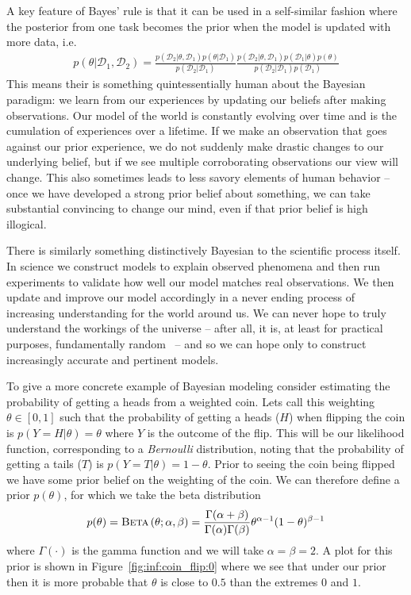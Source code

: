 A key feature of Bayes' rule is that it can be used in a self-similar fashion where the posterior from
one task becomes the prior when the model is updated with more data, i.e.
\begin{align}
	\label{eq:bayes:repeat-bayes}
p(\theta | \mathcal{D}_1, \mathcal{D}_2) = 
\frac{p(\mathcal{D}_2 | \theta, \mathcal{D}_1)p(\theta | \mathcal{D}_1)}{p(\mathcal{D}_2 | \mathcal{D}_1)}
\frac{p(\mathcal{D}_2 | \theta, \mathcal{D}_1)p(\mathcal{D}_1 | \theta) p(\theta)}
{p(\mathcal{D}_2 | \mathcal{D}_1) p(\mathcal{D}_1)} 
\end{align}
This means their is something quintessentially human about the Bayesian paradigm: we learn
from our experiences by updating our beliefs after making observations.  Our model of the world
is constantly evolving over time and is the cumulation of experiences over a lifetime.  
If we make an observation that goes against our prior experience, we do not suddenly make
drastic changes to our underlying belief, but if we see multiple corroborating observations our
view will change.
This also sometimes leads to less savory elements of human behavior -- once we have developed
a strong prior belief about something, we can take substantial convincing to change our mind, even
if that prior belief is high illogical.

There is similarly something distinctively Bayesian to the scientific process itself.  In science we construct models
to explain observed phenomena and then run experiments to validate how well our model matches
real observations.  We then update and improve our model accordingly in a never ending process of
increasing understanding for the world around us.  We can never hope to truly understand the workings
of the universe  -- after all, it is, at least for practical purposes, fundamentally random~\citep{rainforth2013random} 
-- and so we can hope only to construct increasingly accurate and pertinent models.

To give a more concrete example of Bayesian modeling consider estimating
the probability of getting a heads from a weighted coin.  Lets call this weighting $\theta \in [0,1]$ such
that the probability of getting a heads  ($H$)  when flipping the coin is $p(Y=H | \theta)=\theta$
where $Y$ is the outcome of the flip.  This will be our likelihood function, corresponding to a
\emph{Bernoulli} distribution, noting that the probability
of getting a tails ($T$) is $p(Y = T | \theta) = 1-\theta$.
Prior to seeing the coin being flipped we have some prior belief on the weighting of the coin.  We
can therefore define a prior $p(\theta)$, for which we take the beta distribution
\begin{align}
\label{eq:bayes:beta}
p(\theta) = \textsc{Beta}\left(\theta ; \alpha,\beta\right) = \frac{\Gamma(\alpha+\beta)}{\Gamma (\alpha) \Gamma(\beta)}
\theta^{\alpha-1} (1-\theta)^{\beta-1}
\end{align}
where $\Gamma(\cdot)$ is the gamma function and we will take $\alpha=\beta=2$.  
A plot for this prior is shown in Figure~\ref{fig:inf:coin_flip:0}
where we see that under our prior then it is more probable that $\theta$ is close to $0.5$ than the
extremes $0$ and $1$.  

